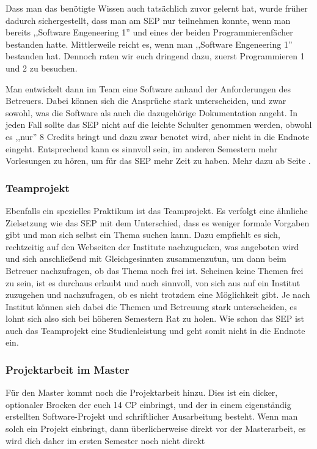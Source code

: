 \begin{multicols}{2}
	Dass man das benötigte Wissen auch tatsächlich zuvor gelernt hat, wurde früher dadurch sichergestellt, dass man am SEP nur teilnehmen konnte, wenn man bereits ,,Software Engeneering 1'' und eines der beiden Programmierenfächer bestanden hatte. Mittlerweile reicht es, wenn man ,,Software Engeneering 1'' bestanden hat. Dennoch  raten wir euch dringend dazu,  zuerst Programmieren 1 und 2 zu besuchen.

	Man entwickelt dann im Team eine Software anhand der Anforderungen des Betreuers. Dabei können sich die Ansprüche stark unterscheiden, und zwar sowohl, was die Software als auch die dazugehörige Dokumentation angeht. In jeden Fall sollte das SEP nicht auf die leichte Schulter genommen werden, obwohl es ,,nur'' 8 Credits bringt und dazu zwar benotet wird, aber nicht in die Endnote eingeht. Entsprechend kann es sinnvoll sein, im anderen Semestern mehr Vorlesungen zu hören, um für das SEP mehr Zeit zu haben. Mehr dazu ab Seite \pageref{bach_studienplan}.

	\subsubsection*{Teamprojekt}
	Ebenfalls ein spezielles Praktikum ist das Teamprojekt. Es verfolgt eine ähnliche Zielsetzung wie das SEP mit dem Unterschied, dass es weniger formale Vorgaben gibt und man sich selbst ein Thema suchen kann. Dazu empfiehlt es sich, rechtzeitig auf den Webseiten der Institute nachzugucken, was angeboten wird und sich anschließend mit Gleichgesinnten zusammenzutun, um dann beim Betreuer nachzufragen, ob das Thema noch frei ist. Scheinen keine Themen frei zu sein, ist es durchaus erlaubt und auch sinnvoll, von sich aus auf ein Institut zuzugehen und nachzufragen, ob es nicht trotzdem eine Möglichkeit gibt. Je nach Institut können sich dabei die Themen und Betreuung stark unterscheiden, es lohnt sich also sich bei höheren Semestern Rat zu holen. Wie schon das SEP ist auch das Teamprojekt eine Studienleistung und geht somit nicht in die Endnote ein.

	\subsubsection*{Projektarbeit im Master}
	Für den Master kommt noch die Projektarbeit hinzu. Dies ist ein dicker, optionaler Brocken der euch 14 CP einbringt, und der in einem eigenständig  erstellten Software-Projekt und schriftlicher Ausarbeitung besteht. Wenn man solch ein Projekt einbringt, dann überlicherweise direkt vor der Masterarbeit, es wird dich daher im ersten Semester noch nicht direkt 


\end{multicols}
